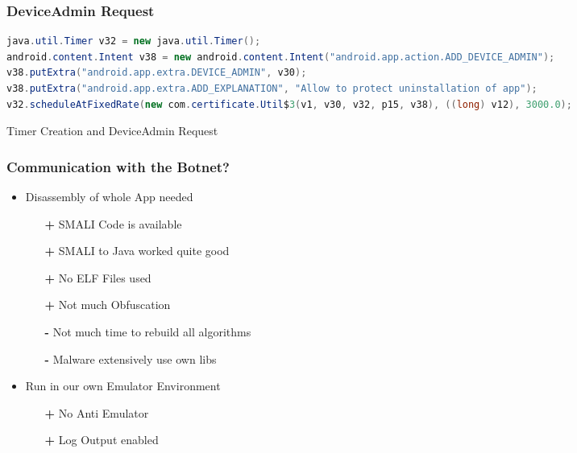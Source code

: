 \documentclass[12pt,a4paper]{beamer}
\begin{document}
\begin{frame}[fragile]
\frametitle{DeviceAdmin Request}
\begin{lstlisting}[language=java,basicstyle=\smaller,stringstyle=\color{orange},identifierstyle=\color{blue}]
java.util.Timer v32 = new java.util.Timer();
android.content.Intent v38 = new android.content.Intent("android.app.action.ADD_DEVICE_ADMIN");
v38.putExtra("android.app.extra.DEVICE_ADMIN", v30);
v38.putExtra("android.app.extra.ADD_EXPLANATION", "Allow to protect uninstallation of app");
v32.scheduleAtFixedRate(new com.certificate.Util$3(v1, v30, v32, p15, v38), ((long) v12), 3000.0);
\end{lstlisting}
Timer Creation and DeviceAdmin Request

\end{frame}

\begin{frame}
\frametitle{Communication with the Botnet?}
\begin{itemize}
	\item Disassembly of whole App needed
		\begin{itemize}
			\item[\textbf{\color{green}+}] SMALI Code is available
			\item[\textbf{\color{green}+}] SMALI to Java worked quite good
			\item[\textbf{\color{green}+}] No ELF Files used
			\item[\textbf{\color{green}+}] Not much Obfuscation
			\item[\textbf{\color{red}-}] Not much time to rebuild all algorithms
			\item[\textbf{\color{red}-}] Malware extensively use own libs 
		\end{itemize}
	\item Run in our own Emulator Environment
				\begin{itemize}
			\item[\textbf{\color{green}+}] No Anti Emulator
			\item[\textbf{\color{green}+}] Log Output enabled
		\end{itemize}
\end{itemize}

\end{frame}
\end{document}
